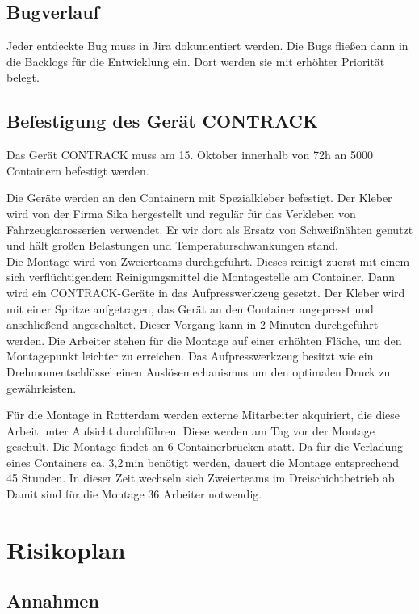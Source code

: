 \subsection{Bugverlauf}
Jeder entdeckte Bug muss in Jira dokumentiert werden. Die Bugs fließen dann in die Backlogs für die Entwicklung ein. Dort werden sie mit erhöhter Priorität belegt.


\subsection{Befestigung des Gerät CONTRACK}
Das Gerät CONTRACK muss am 15. Oktober innerhalb von 72h an 5000 Containern befestigt werden.

Die Geräte werden an den Containern mit Spezialkleber befestigt. Der Kleber wird von der Firma Sika hergestellt und regulär für das Verkleben von Fahrzeugkarosserien verwendet. Er wir dort als Ersatz von Schweißnähten genutzt und hält großen Belastungen und Temperaturschwankungen stand.\\
Die Montage wird von Zweierteams durchgeführt. Dieses reinigt zuerst mit einem sich verflüchtigendem Reinigungsmittel die Montagestelle am Container. Dann wird ein CONTRACK-Geräte in das Aufpresswerkzeug gesetzt. Der Kleber wird mit einer Spritze aufgetragen, das Gerät an den Container angepresst und anschließend angeschaltet. Dieser Vorgang kann in 2 Minuten durchgeführt werden. Die Arbeiter stehen für die Montage auf einer erhöhten Fläche, um den Montagepunkt leichter zu erreichen. Das Aufpresswerkzeug besitzt wie ein Drehmomentschlüssel einen Auslösemechanismus um den optimalen Druck zu gewährleisten.

Für die Montage in Rotterdam werden externe Mitarbeiter akquiriert, die diese Arbeit unter Aufsicht durchführen. Diese werden am Tag vor der Montage geschult. Die Montage findet an 6 Containerbrücken statt. Da für die Verladung eines Containers ca. 3,2\,min benötigt werden, dauert die Montage entsprechend 45 Stunden. In dieser Zeit wechseln sich Zweierteams im Dreischichtbetrieb ab. Damit sind für die Montage 36 Arbeiter notwendig.


\section{Risikoplan}
\subsection{Annahmen} %

